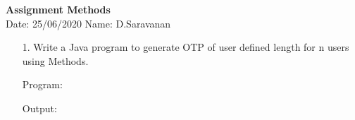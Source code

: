 \documentclass[a4paper,11pt,openright]{report}
\begin{document}
\singlespacing
\pagestyle{plain}

\begin{center}
\textbf{Assignment Methods} \\
Date: 25/06/2020 \hspace{2mm} Name: D.Saravanan
\end{center}

\vspace{10px}

\begin{enumerate}

\item[1.] Write a Java program to generate OTP of user defined length for n users using 
Methods.

\vspace{0.5cm}

Program:


\vspace{0.5cm}

Output:


\end{enumerate}
\end{document}
